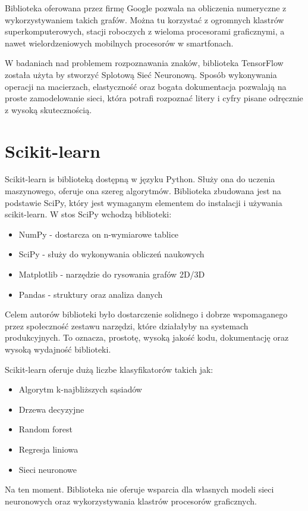 \documentclass[brudnopis]{xmgr}
\begin{document}
Biblioteka oferowana przez firmę Google pozwala na obliczenia numeryczne z wykorzystywaniem takich grafów. Można tu korzystać z ogromnych klastrów superkomputerowych, stacji roboczych z wieloma procesorami graficznymi, a nawet wielordzeniowych mobilnych procesorów w smartfonach.

W badaniach nad problemem rozpoznawania znaków, biblioteka TensorFlow została użyta by stworzyć Splotową  Sieć Neuronową.  Sposób wykonywania operacji na macierzach, elastyczność oraz bogata dokumentacja pozwalają na proste zamodelowanie sieci, która  potrafi rozpoznać litery i cyfry pisane odręcznie z wysoką skutecznością.

\section{Scikit-learn}

Scikit-learn\cite{17} is biblioteką dostępną w języku Python. Służy ona do uczenia maszynowego, oferuje ona szereg algorytmów. Biblioteka zbudowana jest na podstawie SciPy, który jest wymaganym elementem do instalacji i używania scikit-learn. W stos SciPy wchodzą biblioteki:

\begin{itemize}
\item
NumPy - dostarcza on n-wymiarowe tablice
\item
SciPy - służy do wykonywania obliczeń naukowych
\item
Matplotlib - narzędzie do rysowania grafów 2D/3D
\item
Pandas - struktury oraz analiza danych
\end{itemize}

Celem autorów biblioteki było dostarczenie solidnego i dobrze wspomaganego przez społeczność zestawu narzędzi, które działałyby na systemach produkcyjnych. To oznacza,  prostotę, wysoką jakość kodu, dokumentację oraz wysoką wydajność biblioteki.

Scikit-learn oferuje dużą liczbe klasyfikatorów takich jak:
\begin{itemize}
\item
Algorytm k-najbliższych sąsiadów
\item
Drzewa decyzyjne
\item
Random forest
\item
Regresja liniowa
\item
Sieci neuronowe
\end{itemize}

Na ten moment. Biblioteka nie oferuje wsparcia dla własnych modeli sieci neuronowych oraz wykorzystywania klastrów procesorów graficznych.
\end{document}
